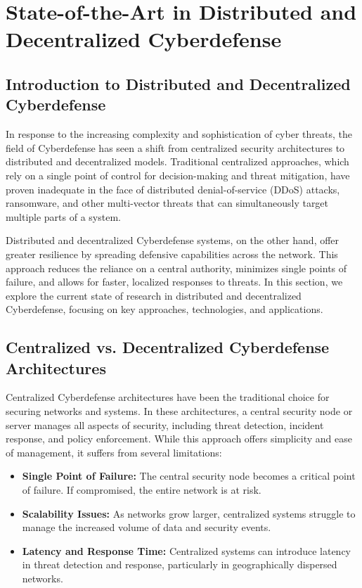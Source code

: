 \section{State-of-the-Art in Distributed and Decentralized Cyberdefense}

\subsection{Introduction to Distributed and Decentralized Cyberdefense}

In response to the increasing complexity and sophistication of cyber threats, the field of Cyberdefense has seen a shift from centralized security architectures to distributed and decentralized models. Traditional centralized approaches, which rely on a single point of control for decision-making and threat mitigation, have proven inadequate in the face of distributed denial-of-service (DDoS) attacks, ransomware, and other multi-vector threats that can simultaneously target multiple parts of a system.

Distributed and decentralized Cyberdefense systems, on the other hand, offer greater resilience by spreading defensive capabilities across the network. This approach reduces the reliance on a central authority, minimizes single points of failure, and allows for faster, localized responses to threats. In this section, we explore the current state of research in distributed and decentralized Cyberdefense, focusing on key approaches, technologies, and applications.

\subsection{Centralized vs. Decentralized Cyberdefense Architectures}

Centralized Cyberdefense architectures have been the traditional choice for securing networks and systems. In these architectures, a central security node or server manages all aspects of security, including threat detection, incident response, and policy enforcement. While this approach offers simplicity and ease of management, it suffers from several limitations:

\begin{itemize}
    \item \textbf{Single Point of Failure:} The central security node becomes a critical point of failure. If compromised, the entire network is at risk.
    \item \textbf{Scalability Issues:} As networks grow larger, centralized systems struggle to manage the increased volume of data and security events.
    \item \textbf{Latency and Response Time:} Centralized systems can introduce latency in threat detection and response, particularly in geographically dispersed networks.
\end{itemize}

